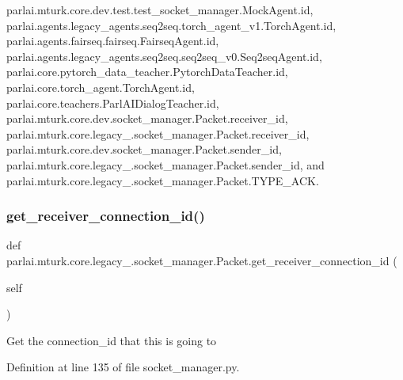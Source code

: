 parlai.\+mturk.\+core.\+dev.\+test.\+test\+\_\+socket\+\_\+manager.\+Mock\+Agent.\+id, parlai.\+agents.\+legacy\+\_\+agents.\+seq2seq.\+torch\+\_\+agent\+\_\+v1.\+Torch\+Agent.\+id, parlai.\+agents.\+fairseq.\+fairseq.\+Fairseq\+Agent.\+id, parlai.\+agents.\+legacy\+\_\+agents.\+seq2seq.\+seq2seq\+\_\+v0.\+Seq2seq\+Agent.\+id, parlai.\+core.\+pytorch\+\_\+data\+\_\+teacher.\+Pytorch\+Data\+Teacher.\+id, parlai.\+core.\+torch\+\_\+agent.\+Torch\+Agent.\+id, parlai.\+core.\+teachers.\+Parl\+A\+I\+Dialog\+Teacher.\+id, parlai.\+mturk.\+core.\+dev.\+socket\+\_\+manager.\+Packet.\+receiver\+\_\+id, parlai.\+mturk.\+core.\+legacy\+\_.\+socket\+\_\+manager.\+Packet.\+receiver\+\_\+id, parlai.\+mturk.\+core.\+dev.\+socket\+\_\+manager.\+Packet.\+sender\+\_\+id, parlai.\+mturk.\+core.\+legacy\+\_.\+socket\+\_\+manager.\+Packet.\+sender\+\_\+id, and parlai.\+mturk.\+core.\+legacy\+\_.\+socket\+\_\+manager.\+Packet.\+T\+Y\+P\+E\+\_\+\+A\+CK.

\mbox{\label{classparlai_1_1mturk_1_1core_1_1legacy__2018_1_1socket__manager_1_1Packet_ac2aeaa0f298f1dc750abbbcbd2ced9d6}} 
\subsubsection{\texorpdfstring{get\+\_\+receiver\+\_\+connection\+\_\+id()}{get\_receiver\_connection\_id()}}
{\footnotesize\ttfamily def parlai.\+mturk.\+core.\+legacy\+\_.\+socket\+\_\+manager.\+Packet.\+get\+\_\+receiver\+\_\+connection\+\_\+id (\begin{DoxyParamCaption}\item[{}]{self }\end{DoxyParamCaption})}

\begin{DoxyVerb}Get the connection_id that this is going to\end{DoxyVerb}
 

Definition at line 135 of file socket\+\_\+manager.\+py.



